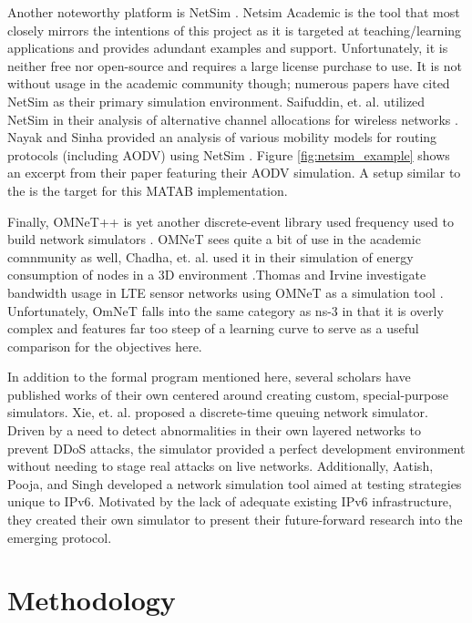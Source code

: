 \documentclass[conference]{IEEEtran}
\begin{document}
Another noteworthy platform is NetSim \cite{netsim}. Netsim Academic is the tool that most closely mirrors the intentions of this project as it is targeted at teaching/learning applications and provides adundant examples and support. Unfortunately, it is neither free nor open-source and requires a large license purchase to use. It is not without usage in the academic community though; numerous papers have cited NetSim as their primary simulation environment. Saifuddin, et. al. utilized NetSim in their analysis of alternative channel allocations for wireless networks \cite{netsim_spectrum}.  Nayak and Sinha provided an analysis of various mobility models for routing protocols (including AODV) using NetSim \cite{netsim_mobility}. Figure \ref{fig:netsim_example} shows an excerpt from their paper featuring their AODV simulation. A setup similar to the is the target for this MATAB implementation.

Finally, OMNeT++ is yet another discrete-event library used frequency used to build network simulators \cite{omnet}. OMNeT sees quite a bit of use in the academic comnmunity as well, Chadha, et. al. used it in their simulation of energy consumption of nodes in a 3D environment \cite{omnet_efficient}.Thomas and Irvine investigate bandwidth usage in LTE sensor networks using OMNeT as a simulation tool \cite{omnet_lte}. Unfortunately, OmNeT falls into the same category as ns-3 in that it is overly complex and features far too steep of a learning curve to serve as a useful comparison for the objectives here.

In addition to the formal program mentioned here, several scholars have published works of their own centered around creating custom, special-purpose simulators. Xie, et. al. \cite{8247856} proposed a discrete-time queuing network simulator. Driven by a need to detect abnormalities in their own layered networks to prevent DDoS attacks, the simulator provided a perfect development environment without needing to stage real attacks on live networks. Additionally, Aatish, Pooja, and Singh \cite{8071602} developed a network simulation tool aimed at testing strategies unique to IPv6. Motivated by the lack of adequate existing IPv6 infrastructure, they created their own simulator to present their future-forward research into the emerging protocol.

\section{Methodology}
\end{document}
